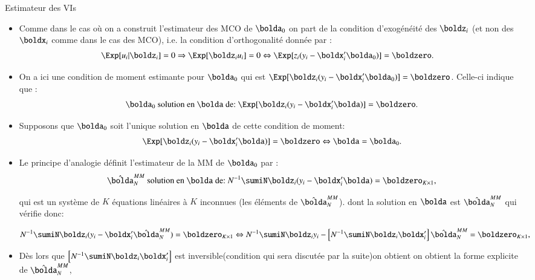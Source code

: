 \begin{frame}[allowframebreaks]{Estimateur des VIs}
\begin{itemize}
\item Comme dans le cas où on a construit l’estimateur des MCO de $\bolda_0$
on part de la condition d’exogénéité des $\boldz_i$ (et non des $\boldx_i$ comme dans le cas
des MCO), i.e. la condition d’orthogonalité donnée par :
\begin{align*}
    \Exp[u_i|\boldz_i]=0 &\Rightarrow \Exp[\boldz_iu_i]=0 \Leftrightarrow 
    \Exp[z_i(y_i-\boldx_i^\prime\bolda_0)]=\boldzero.
\end{align*}
\item On a ici une condition de moment estimante pour $\bolda_0$ qui est $\Exp[\boldz_i(y_i -\boldx_i^\prime\bolda_0)]= \boldzero$. 
Celle-ci indique que : 
\begin{align*} 
    \bolda_0 \  \text{solution en $\bolda$ de:} \ \Exp[\boldz_i(y_i -\boldx_i^\prime\bolda)]= \boldzero.
\end{align*}
\item Supposons que $\bolda_0$ soit l’unique 
solution en $\bolda$ de cette condition de moment:
\begin{align*}
    \Exp[\boldz_i(y_i-\boldx_i^\prime \bolda)] = \boldzero \Leftrightarrow \bolda = \bolda_0.
\end{align*}
\item Le principe d’analogie définit l’estimateur de la MM de $\bolda_0$ par :
\begin{align*}
    \hat{\bolda}_N^{MM} 
    \  \text{solution en $\bolda$ de:} \
    N^{-1}\sumiN \boldz_i(y_i-\boldx_i^\prime\bolda)=\boldzero_{K\times 1},
\end{align*}

qui est un système de $K$ équations linéaires à $K$ inconnues (les éléments de  $\hat{\bolda}_N^{MM}$). 
dont la solution en $\bolda$ est $\hat{\bolda}_N^{MM}$ qui vérifie donc:

\begin{align*}
    N^{-1}\sumiN \boldz_i(y_i-\boldx_i^\prime\hat{\bolda}_N^{MM})=\boldzero_{K\times 1} & \Leftrightarrow
    N^{-1}\sumiN \boldz_iy_i - \left[N^{-1}\sumiN \boldz_i\boldx_i^\prime \right]\hat{\bolda}_N^{MM}=\boldzero_{K\times 1},
\end{align*}
\item Dès lors que $\left[N^{-1}\sumiN \boldz_i\boldx_i^\prime \right]$ est inversible(condition qui sera discutée par la suite)on obtient
on obtient la forme explicite de $\hat{\bolda}_N^{MM}$,


\end{itemize}
\end{frame}
